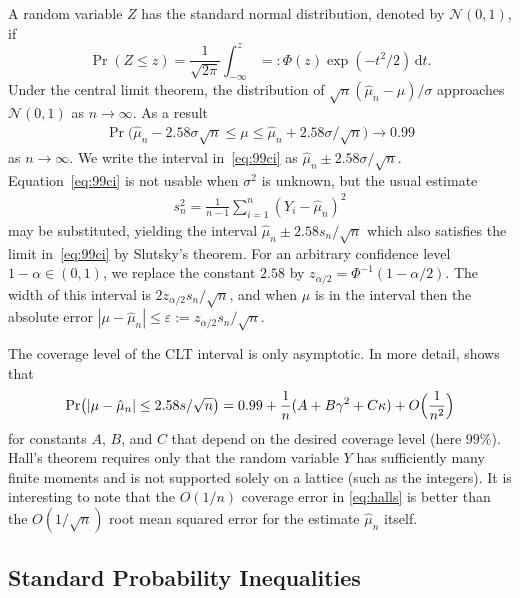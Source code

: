 \documentclass[graybox]{svmult}
\newcommand{\rd}{\,\mathrm{d}}
\newcommand{\dnorm}{\mathcal{N}}
\newcommand{\abs}[1]{\left|#1\right|}
\def\abs#1{\ensuremath{\left \lvert #1 \right \rvert}}
\begin{document}
A random variable $Z$ has the standard normal distribution,
denoted by $\dnorm(0,1)$, if 
$$\Pr( Z\le z ) = \frac1{\sqrt{2\pi}}\int_{-\infty}^z =: \Phi(z)
\exp(-t^2/2)\rd t.$$
Under the central limit theorem,
the distribution of $\sqrt{n}(\hat\mu_n-\mu)/\sigma$
approaches $\dnorm(0,1)$ 
as $n\to\infty$.
As a result
\begin{align}\label{eq:99ci}
\Pr\bigl(
\hat\mu_n-2.58\sigma\sqrt{n}
\le \mu\le
\hat\mu_n+2.58\sigma/\sqrt{n}\bigr)
\to 0.99
\end{align}
as $n\to\infty$.
We write the interval in~\eqref{eq:99ci}
as $\hat\mu_n\pm 2.58\sigma/\sqrt{n}$.
Equation~\eqref{eq:99ci} is not usable when
$\sigma^2$ is unknown, but the usual estimate
\begin{align}\label{eq:samplevar}
s^2_n = \frac1{n-1}\sum_{i=1}^n(Y_i-\hat\mu_n)^2
\end{align}
may be substituted, yielding the interval
$\hat\mu_n\pm2.58s_n/\sqrt{n}$ which also
satisfies the limit in~\eqref{eq:99ci}
by Slutsky's theorem.  For an arbitrary
confidence level $1-\alpha\in(0,1)$, we replace
the constant $2.58$ by $z_{\alpha/2}=\Phi^{-1}(1-\alpha/2)$. 
The width of this interval is
$2z_{\alpha/2}s_n/\sqrt{n}$, and when $\mu$ is in
the interval then the absolute error
$|\mu-\hat\mu_n|\le 
\varepsilon := z_{\alpha/2}s_n/\sqrt{n}$.


The coverage level of the CLT interval is only asymptotic. In
more detail, \cite{Hal86} shows that
\begin{align}\label{eq:halls}
\Pr\bigl(
\abs{\mu - 
\hat\mu_n} \le 2.58 s/\sqrt{n}
\bigr)
= 0.99 + \frac1n(A + B\gamma^2+C\kappa) + O\Bigl(\frac1{n^2}\Bigr)
\end{align}
for constants $A$, $B$, and $C$ that depend
on the desired coverage level (here $99$\%).  Hall's theorem
requires only that the random variable $Y$ has sufficiently
many finite moments
and is not supported solely on a lattice (such as
the integers).
It is interesting to note that the $O(1/n)$ coverage error in
\eqref{eq:halls} is better than the $O(1/\sqrt{n})$
root mean squared error for the estimate $\hat\mu_n$ itself.


\subsection{Standard Probability Inequalities}
\end{document}
